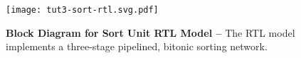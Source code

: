 
\begin{figure}[b]
  \cbxcaptionsize

  \begin{varwidth}[t]{\tw}
    \vspace{0pt}

    \texttt{[image: tut3-sort-rtl.svg.pdf]}

  \end{varwidth}
  \hfill%
  \begin{minipage}[t]{0.33\tw}
    \vspace{0pt}

    \caption{\textbf{Block Diagram for Sort Unit RTL Model --} The RTL
      model implements a three-stage pipelined, bitonic sorting network.}
    \label{fig-tut3-sort-rtl}

  \end{minipage}

\end{figure}

